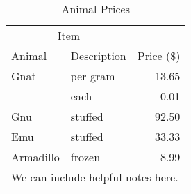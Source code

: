 \begin{table}[h!]
	\centering
	\caption{Animal Prices}\label{tab:animal}
	\begin{tabular}{llr} \toprule
		\multicolumn{2}{c}{Item} \\ \cmidrule(r){1-2}
		Animal & Description & Price (\$)\\ \midrule
		Gnat & per gram & 13.65 \\
		& each & 0.01 \\
		Gnu & stuffed & 92.50 \\
		Emu & stuffed & 33.33 \\ \addlinespace
		Armadillo & frozen & 8.99 \\ \midrule
		\multicolumn{3}{l}{\footnotesize We can include helpful notes here.} \\
		\bottomrule
	\end{tabular}
\end{table}
